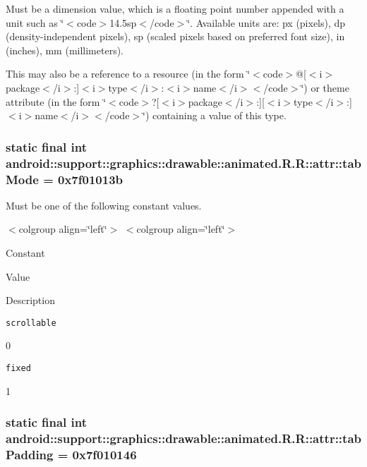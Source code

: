 Must be a dimension value, which is a floating point number appended with a unit such as \char`\"{}$<$code$>$14.5sp$<$/code$>$\char`\"{}. Available units are: px (pixels), dp (density-independent pixels), sp (scaled pixels based on preferred font size), in (inches), mm (millimeters). 

This may also be a reference to a resource (in the form \char`\"{}$<$code$>$@\mbox{[}$<$i$>$package$<$/i$>$:\mbox{]}$<$i$>$type$<$/i$>$:$<$i$>$name$<$/i$>$$<$/code$>$\char`\"{}) or theme attribute (in the form \char`\"{}$<$code$>$?\mbox{[}$<$i$>$package$<$/i$>$:\mbox{]}\mbox{[}$<$i$>$type$<$/i$>$:\mbox{]}$<$i$>$name$<$/i$>$$<$/code$>$\char`\"{}) containing a value of this type. \hypertarget{classandroid_1_1support_1_1graphics_1_1drawable_1_1animated_1_1_r_1_1attr_6751be722c127ab3ef9c7ca72aaab8a6}{
\subsubsection[{tabMode}]{\setlength{\rightskip}{0pt plus 5cm}static final int android::support::graphics::drawable::animated.R.R::attr::tabMode = 0x7f01013b}}
\label{classandroid_1_1support_1_1graphics_1_1drawable_1_1animated_1_1_r_1_1attr_6751be722c127ab3ef9c7ca72aaab8a6}


Must be one of the following constant values. \begin{TabularC}{0}
\hline
\end{TabularC}
$<$colgroup align=\char`\"{}left\char`\"{}$>$ $<$colgroup align=\char`\"{}left\char`\"{}$>$ 

Constant

Value

Description 

{\tt scrollable}

0

{\tt fixed}

1\hypertarget{classandroid_1_1support_1_1graphics_1_1drawable_1_1animated_1_1_r_1_1attr_778fe28f438cff3096d1dee788906926}{
\subsubsection[{tabPadding}]{\setlength{\rightskip}{0pt plus 5cm}static final int android::support::graphics::drawable::animated.R.R::attr::tabPadding = 0x7f010146}}
\label{classandroid_1_1support_1_1graphics_1_1drawable_1_1animated_1_1_r_1_1attr_778fe28f438cff3096d1dee788906926}



